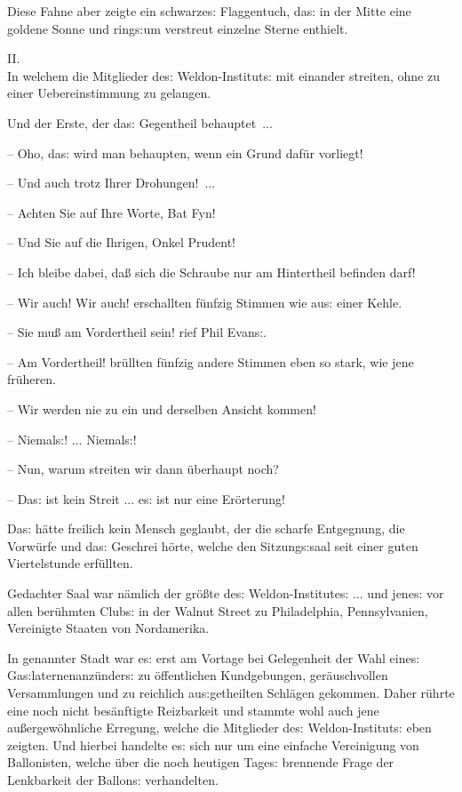 \documentclass[oneside,12pt]{book}
\newenvironment{antiqua}{\normalfont}{}
\newcommand{\s}{s:}
\begin{document}
Diese Fahne aber zeigte ein schwarze{\s} Flaggentuch, da{\s} in der
Mitte eine goldene Sonne und ring{\s}um verstreut einzelne Sterne
enthielt.



\newpage\begin{center}\label{kap02}
{\large \begin{antiqua}II.\end{antiqua}\\\medskip
In welchem die Mitglieder de{\s} Weldon-Institut{\s} mit einander
streiten, ohne zu einer Uebereinstimmung zu gelangen.\\\bigskip}
\end{center}



{\glqq}Und der Erste, der da{\s} Gegentheil behauptet~...

-- Oho, da{\s} wird man behaupten, wenn ein Grund daf\"ur vorliegt!

-- Und auch trotz Ihrer Drohungen!~...

-- Achten Sie auf Ihre Worte, Bat Fyn!

-- Und Sie auf die Ihrigen, Onkel Prudent!

-- Ich bleibe dabei, da{\ss} sich die Schraube nur am Hintertheil
befinden darf!

-- Wir auch! Wir auch! erschallten f\"unfzig Stimmen wie au{\s} einer
Kehle.

-- Sie mu{\ss} am Vordertheil sein! rief Phil Evan{\s}.

-- Am Vordertheil! br\"ullten f\"unfzig andere Stimmen eben so stark,
wie jene fr\"uheren.

-- Wir werden nie zu ein und derselben Ansicht kommen!

-- Niemal{\s}! ... Niemal{\s}!

-- Nun, warum streiten wir dann \"uberhaupt noch?

-- Da{\s} ist kein Streit ... e{\s} ist nur eine Er\"orterung!{\grqq}

Da{\s} h\"atte freilich kein Mensch geglaubt, der die scharfe
Entgegnung, die Vorw\"urfe und da{\s} Geschrei h\"orte, welche den
Sitzung{\s}saal seit einer guten Viertelstunde erf\"ullten.

Gedachter Saal war n\"amlich der gr\"o{\ss}te de{\s}
Weldon-Institute{\s} ... und jene{\s} vor allen ber\"uhmten Club{\s}
in der Walnut Street zu Philadelphia, Pennsylvanien, Vereinigte
Staaten von Nordamerika.

In genannter Stadt war e{\s} erst am Vortage bei Gelegenheit der Wahl
eine{\s} Ga{\s}laternenanz\"under{\s} zu \"offentlichen Kundgebungen,
ger\"auschvollen Versammlungen und zu reichlich au{\s}getheilten
Schl\"agen gekommen. Daher r\"uhrte eine noch nicht bes\"anftigte
Reizbarkeit und stammte wohl auch jene au{\ss}ergew\"ohnliche
Erregung, welche die Mitglieder de{\s} Weldon-Institut{\s} eben
zeigten. Und hierbei handelte e{\s} sich nur um eine einfache
Vereinigung von {\glqq}Ballonisten{\grqq}, welche \"uber die noch
heutigen Tage{\s} brennende Frage der Lenkbarkeit der Ballon{\s}
verhandelten.
\end{document}
